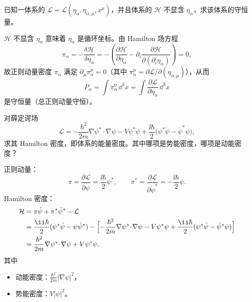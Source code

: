 \begin{question}
已知一体系的 \(\mathcal L=\mathcal L(\eta_\alpha,\eta_{\alpha,\mu},x^\mu)\)，并且体系的 \(\mathcal H\) 不显含 \(\eta_\alpha\)，求该体系的守恒量。
\begin{solution}
\(\mathcal H\) 不显含 \(\eta_\alpha\) 意味着 \(\eta_\alpha\) 是循环坐标。由 Hamilton 场方程
\[
\dot\pi_\alpha =-\frac{\delta\mathcal H}{\delta\eta_\alpha}
= -\left(\frac{\partial\mathcal H}{\partial\eta_\alpha}
-\partial_i\frac{\partial\mathcal H}{\partial(\partial_i\eta_\alpha)}\right)=0,
\]
故正则动量密度 \(\pi_\alpha\) 满足 \(\partial_\mu\pi_\alpha^\mu=0\)（其中 \(\pi_\alpha^\mu=\partial\mathcal L/\partial(\eta_{\alpha,\mu})\)），从而
\[
P_\alpha=\int\pi_\alpha^0\,\dd^3x=\int\frac{\partial\mathcal L}{\partial\dot\eta_\alpha}\,\dd^3x
\]
是守恒量（总正则动量守恒）。
\end{solution}
\end{question}

\begin{question}
对薛定谔场
\[
\mathcal L = -\frac{\hbar^2}{2m}\nabla\psi^*\!\cdot\!\nabla\psi
-V\psi^*\psi+\frac{\ii\hbar}{2}\bigl(\psi^*\dot\psi-\dot\psi^*\psi\bigr),
\]
求其 Hamilton 密度，即体系的能量密度。其中哪项是势能密度，哪项是动能密度？
\begin{solution}
正则动量：
\[
\pi=\frac{\partial\mathcal L}{\partial\dot\psi}=\frac{\ii\hbar}{2}\psi^*,\qquad
\pi^*=\frac{\partial\mathcal L}{\partial\dot\psi^*}=-\frac{\ii\hbar}{2}\psi .
\]
Hamilton 密度：
\[
\begin{aligned}
\mathcal H &=\pi\dot\psi+\pi^*\dot\psi^*-\mathcal L \\
&=\frac{\ii\hbar}{2}(\psi^*\dot\psi-\psi\dot\psi^*)
-\Bigl[-\frac{\hbar^2}{2m}\nabla\psi^*\!\cdot\!\nabla\psi
-V\psi^*\psi+\frac{\ii\hbar}{2}(\psi^*\dot\psi-\dot\psi^*\psi)\Bigr] \\
&=\frac{\hbar^2}{2m}\nabla\psi^*\!\cdot\!\nabla\psi+V\psi^*\psi .
\end{aligned}
\]
其中
\begin{itemize}
  \item 动能密度：\(\displaystyle \frac{\hbar^2}{2m}|\nabla\psi|^2\)，
  \item 势能密度：\(\displaystyle V|\psi|^2\)。
\end{itemize}
\end{solution}
\end{question}

